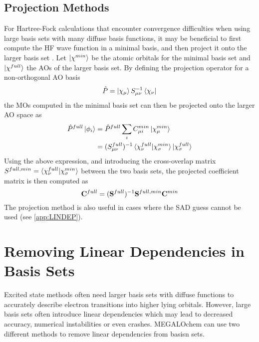 \section{Projection Methods}

For Hartree-Fock calculations that encounter convergence difficulties when using large basis sets with many diffuse basis functions, it may be beneficial to first compute the HF wave function in a minimal basis, and then project it onto the larger basis set \cite{Leh2019}. Let $\ket{\smash{\chi^{min}}}$ be the atomic orbitals for the minimal basis set and $\ket{\smash{\chi^{full}}}$ the AOs of the larger basis set. By defining the projection operator for a non-orthogonal AO basis
\begin{equation}
\hat{P} = \ket{\smash{\chi_{\mu}}} S_{\mu\nu}^{-1} \bra{\smash{\chi_{\nu}}}
\end{equation}
\noindent the MOs computed in the minimal basis set can then be projected onto the larger AO space as
\begin{equation}
\begin{split}
\hat{P}^{full}\ket{\smash{\phi_i}} &= \hat{P}^{full}\sum_i C^{min}_{\mu i} \ket{\smash{\chi^{min}_\mu}} \\
	&= (S^{full}_{\mu\nu})^{-1} \bra{\smash{\chi^{full}_{\nu}}}\ket{\smash{\chi^{min}_{\sigma}}} \ket{\smash{\chi^{full}_{\sigma}}}
\end{split} 
\end{equation}
\noindent Using the above expression, and introducing the cross-overlap matrix $S^{full,min} = \bra{\smash{\chi^{full}_{\nu}}}\ket{\smash{\chi^{min}_{\sigma}}}$ between the two basis sets, the projected coefficient matrix is then computed as
\begin{equation}
\mathbf{C}^{full} = (\mathbf{S}^{full})^{-1} \mathbf{S}^{full,min} \mathbf{C}^{min} 
\end{equation}
\noindent The projection method is also useful in cases where the SAD guess cannot be used (see \ref{app:LINDEP}). 

\chapter{Removing Linear Dependencies in Basis Sets \label{app:LINDEP}}

Excited state methods often need larger basis sets with diffuse functions to accurately describe electron transitions into higher lying orbitals. However, large basis sets often introduce linear dependencies which may lead to decreased accuracy, numerical instabilities or even crashes. MEGALOchem can use two different methods to remove linear dependencies from basisn sets.

